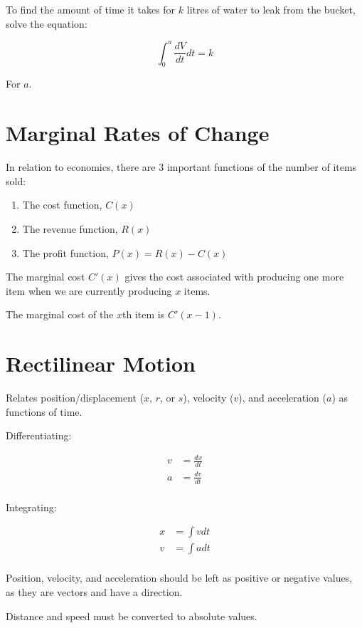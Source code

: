 \documentclass[a4paper,11pt]{article}
\begin{document}
To find the amount of time it takes for $k$ litres of water to leak from the
bucket, solve the equation:

$$
\int_0^a \frac{dV}{dt} dt = k
$$

For $a$.




\section{Marginal Rates of Change}

In relation to economics, there are 3 important functions of the number of items
sold:

\begin{enumerate}
\item The cost function, $C(x)$
\item The revenue function, $R(x)$
\item The profit function, $P(x) = R(x) - C(x)$
\end{enumerate}

The marginal cost $C'(x)$ gives the cost associated with producing one more
item when we are currently producing $x$ items.

The marginal cost of the $x$th item is $C'(x - 1)$.




\section{Rectilinear Motion}

Relates position/displacement ($x$, $r$, or $s$), velocity ($v$), and
acceleration ($a$) as functions of time.

Differentiating:

$$
\begin{aligned}
v & = \frac{dx}{dt} \\
a & = \frac{dv}{dt} \\
\end{aligned}
$$

Integrating:

$$
\begin{aligned}
x & = \int v dt \\
v & = \int a dt \\
\end{aligned}
$$

Position, velocity, and acceleration should be left as positive or negative
values, as they are vectors and have a direction.

Distance and speed must be converted to absolute values.
\end{document}
